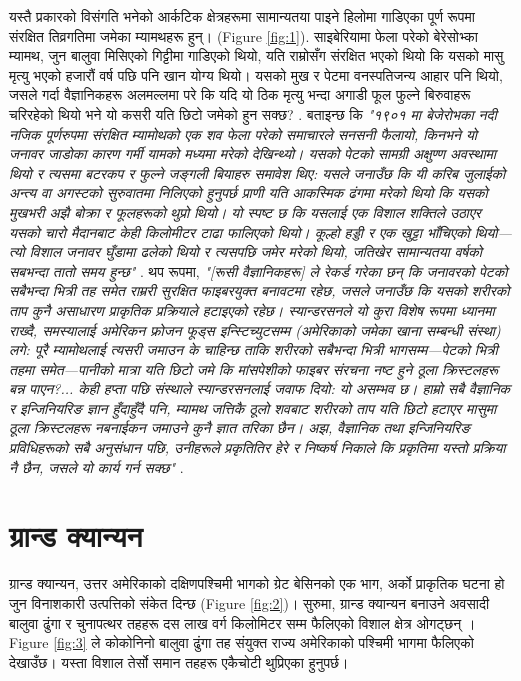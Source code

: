 \documentclass[10pt,twocolumn,letterpaper]{article}
\begin{document}
यस्तै प्रकारको विसंगति भनेको आर्कटिक क्षेत्रहरूमा सामान्यतया पाइने हिलोमा गाडिएका पूर्ण रूपमा संरक्षित तिव्रगतिमा जमेका म्यामथहरू हुन्। (Figure \ref{fig:1}). साइबेरियामा फेला परेको बेरेसोभ्का म्यामथ, जुन बालुवा मिसिएको गिट्टीमा गाडिएको थियो, यति राम्रोसँग संरक्षित भएको थियो कि यसको मासु मृत्यु भएको हजारौं वर्ष पछि पनि खान योग्य थियो। यसको मुख र पेटमा वनस्पतिजन्य आहार पनि थियो, जसले गर्दा वैज्ञानिकहरू अलमल्लमा परे कि यदि यो ठिक मृत्यु भन्दा अगाडी फूल फुल्ने बिरुवाहरू चरिरहेको थियो भने यो कसरी यति छिटो जमेको हुन सक्छ? \cite{17}. बताइन्छ कि \textit{"१९०१ मा बेजेरोभका नदी नजिक पूर्णरुपमा संरक्षित म्यामोथको एक शव फेला परेको समाचारले सनसनी फैलायो, किनभने यो जनावर जाडोका कारण गर्मी यामको मध्यमा मरेको देखिन्थ्यो। यसको पेटको सामग्री अक्षुण्ण अवस्थामा थियो र त्यसमा बटरकप र फुल्ने जङ्गली बियाहरु समावेश थिए: यसले जनाउँछ कि यी करिब जुलाईको अन्त्य वा अगस्टको सुरुवातमा निलिएको हुनुपर्छ  प्राणी यति आकस्मिक ढंगमा मरेको थियो कि यसको मुखभरी अझै बोक्रा र फूलहरूको थुप्रो थियो। यो स्पष्ट छ कि यसलाई एक विशाल शक्तिले उठाएर यसको चारो मैदानबाट केही किलोमीटर टाढा फालिएको  थियो। कूल्हो हड्डी र एक खुट्टा भाँचिएको थियो—त्यो विशाल जनावर घुँडामा ढलेको थियो र त्यसपछि जमेर मरेको थियो, जतिखेर सामान्यतया वर्षको सबभन्दा तातो समय हुन्छ"} \cite{18}. थप रूपमा, \textit{"[रूसी वैज्ञानिकहरू] ले रेकर्ड गरेका छन् कि जनावरको पेटको सबैभन्दा भित्री तह समेत राम्ररी सुरक्षित फाइबरयुक्त बनावटमा रहेछ, जसले जनाउँछ कि यसको शरीरको ताप कुनै असाधारण प्राकृतिक प्रक्रियाले हटाइएको रहेछ। स्यान्डरसनले यो कुरा विशेष रूपमा ध्यानमा राख्दै, समस्यालाई अमेरिकन फ्रोजन फूड्स इन्स्टिच्युटसम्म (अमेरिकाको जमेका खाना सम्बन्धी संस्था) लगे: पूरै म्यामोथलाई त्यसरी जमाउन के चाहिन्छ ताकि शरीरको सबैभन्दा भित्री भागसम्म—पेटको भित्री तहमा समेत—पानीको मात्रा यति छिटो जमे कि मांसपेशीको फाइबर संरचना नष्ट हुने ठूला क्रिस्टलहरू बन्न पाएन?... केही हप्ता पछि संस्थाले स्यान्डरसनलाई जवाफ दियो: यो असम्भव छ। हाम्रो सबै वैज्ञानिक र इन्जिनियरिङ ज्ञान हुँदाहुँदै पनि, म्यामथ जत्तिकै ठूलो शवबाट शरीरको ताप यति छिटो हटाएर मासुमा ठूला  क्रिस्टलहरू नबनाईकन जमाउने  कुनै ज्ञात तरिका छैन। अझ, वैज्ञानिक तथा इन्जिनियरिङ प्रविधिहरूको सबै अनुसंधान पछि, उनीहरूले प्रकृतितिर हेरे र निष्कर्ष निकाले कि प्रकृतिमा यस्तो प्रक्रिया नै छैन, जसले यो कार्य गर्न सक्छ"} \cite{19}.

\section{ग्रान्ड क्यान्यन}

ग्रान्ड क्यान्यन, उत्तर अमेरिकाको दक्षिणपश्चिमी भागको ग्रेट बेसिनको एक भाग, अर्को प्राकृतिक घटना हो जुन विनाशकारी उत्पत्तिको संकेत दिन्छ (Figure \ref{fig:2})। सुरुमा, ग्रान्ड क्यान्यन बनाउने अवसादी बालुवा ढुंगा र चुनापत्थर तहहरू दस लाख वर्ग किलोमिटर सम्म फैलिएको विशाल क्षेत्र ओगट्छन् \cite{21}। Figure \ref{fig:3} ले कोकोनिनो बालुवा ढुंगा तह संयुक्त राज्य अमेरिकाको पश्चिमी भागमा फैलिएको देखाउँछ। यस्ता विशाल तेर्सो समान तहहरू एकैचोटी थुप्रिएका हुनुपर्छ।
\end{document}
